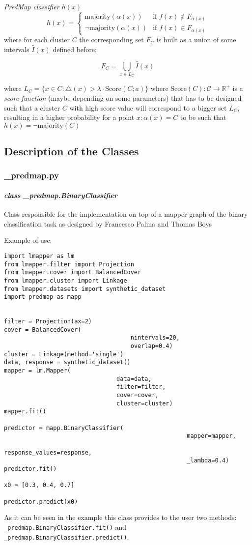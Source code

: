 \begin{definition}{\textit{PredMap classifier $h(x)$}}\\
$$h(x) = \begin{cases}
\text{majority}(\alpha(x))& \text{if } f(x)\notin F_{\alpha(x)}\\
\lnot\text{majority}(\alpha(x))& \text{if } f(x)\in F_{\alpha(x)}
\end{cases}$$ where for each cluster $C$ the corresponding set $F_C$ is built as a union of some intervals $\hat I(x)$ defined before: 

$$F_C=\bigcup_{x\in L_C} \hat I(x)$$

where $L_C = \{x\in C: \triangle(x)>\lambda\cdot \text{Score}(C;a)\}$ where Score$(C): \mathcal C\rightarrow \mathbb R^+$ is a \textit{score function} (maybe depending on some parameters)  that has to be designed such that a cluster $C$ with high score value will correspond to a bigger set $L_C$, resulting in a higher probability for a point $x: \alpha(x)=C$ to be such that $h(x)=\lnot \text{majority}(C)$
\end{definition}

\subsection{Description of the Classes}\label{sec:predmap description of the classes}

\subsubsection{\_predmap.py}
\paragraph{\textit{class \_predmap.BinaryClassifier}}
Class responsible for the implementation on top of a mapper graph of the binary
classification task as designed by Francesco Palma and Thomas Boys

Example of use:
\begin{lstlisting}[style=mystyle, deletekeywords={filter}]
import lmapper as lm
from lmapper.filter import Projection
from lmapper.cover import BalancedCover
from lmapper.cluster import Linkage
from lmapper.datasets import synthetic_dataset
import predmap as mapp


filter = Projection(ax=2)
cover = BalancedCover(
									nintervals=20,
									overlap=0.4)
cluster = Linkage(method='single')
data, response = synthetic_dataset()
mapper = lm.Mapper(
								data=data,
								filter=filter,
								cover=cover,
								cluster=cluster)
mapper.fit()

predictor = mapp.BinaryClassifier(
													mapper=mapper,
													response_values=response,
													_lambda=0.4)
predictor.fit()

x0 = [0.3, 0.4, 0.7]

predictor.predict(x0)
\end{lstlisting}
As it can be seen in the example this class provides to the user two methods: \lstinline|_predmap.BinaryClassifier.fit()| and \lstinline|_predmap.BinaryClassifier.predict()|. 

